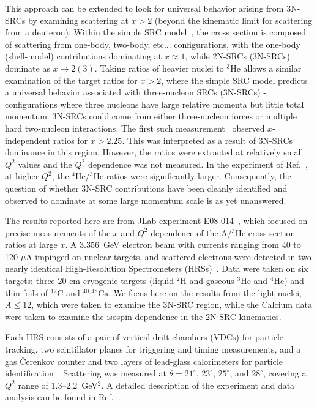 \documentclass[aps,prl,superscriptaddress,showpacs,twocolumn,floatfix,amsmath,amssymb]{revtex4-1}
\begin{document}
This approach can be extended to look for universal behavior arising from 3N-SRCs by examining scattering at
$x>2$ (beyond the kinematic limit for scattering from a deuteron). Within the simple SRC
model~\cite{Frankfurt1981215}, the cross section is composed of scattering from one-body, two-body,
etc... configurations, with the one-body (shell-model) contributions dominating at $x \approx 1$, while
2N-SRCs (3N-SRCs) dominate as $x \to 2 (3)$. Taking ratios of heavier nuclei to $^3$He allows a similar
examination of the target ratios for $x>2$, where the simple SRC model predicts a universal behavior
associated with three-nucleon SRCs (3N-SRCs) - configurations where three nucleons have large relative
momenta but little total momentum. 3N-SRCs could come from either three-nucleon forces or multiple hard
two-nucleon interactions. The first such measurement~\cite{PhysRevLett.96.082501} observed $x$-independent
ratios for $x > 2.25$. This was interpreted as a result of 3N-SRCs dominance in this region.
However, the ratios were extracted at relatively small $Q^2$ values and the $Q^2$ dependence was not measured.
In the experiment of Ref.~\cite{fomin2012}, at higher $Q^2$, the $^4$He/$^3$He ratios  were significantly
larger. Consequently, the question of whether 3N-SRC contributions have been cleanly identified and observed
to dominate at some large momentum scale is as yet unanswered.

%
The results reported here are from JLab experiment E08-014~\cite{e08014_pr}, which focused on precise
measurements of the $x$ and $Q^2$ dependence of the A/$^3$He cross section ratios at large $x$. A $3.356$~GeV
electron beam with currents ranging from 40 to 120 $\mu$A impinged on nuclear targets, and scattered
electrons were detected in two nearly identical High-Resolution Spectrometers (HRSs)~\cite{halla_nim}. Data
were taken on six targets: three 20-cm cryogenic targets (liquid $^2$H and gaseous $^3$He and $^4$He) and
thin foils of $\mathrm{^{12}C}$ and $\mathrm{^{40,48}Ca}$. We focus here on the results from
the light nuclei, $A \leq 12$, which were taken to examine the 3N-SRC region, while the Calcium data were
taken to examine the isospin dependence in the 2N-SRC kinematics.

Each HRS consists of a pair of vertical drift chambers (VDCs) for particle tracking, two scintillator planes
for triggering and timing measurements, and a gas \v{C}erenkov counter and two layers of lead-glass
calorimeters for particle identification~\cite{halla_nim}. Scattering was measured at $\theta=21^\circ$,
$23^\circ$, $25^\circ$, and $28^\circ$, covering a $Q^2$ range of 1.3--2.2~GeV$^2$. A detailed description
of the experiment and data analysis can be found in Ref.~\cite{zye_thesis}.
\end{document}
